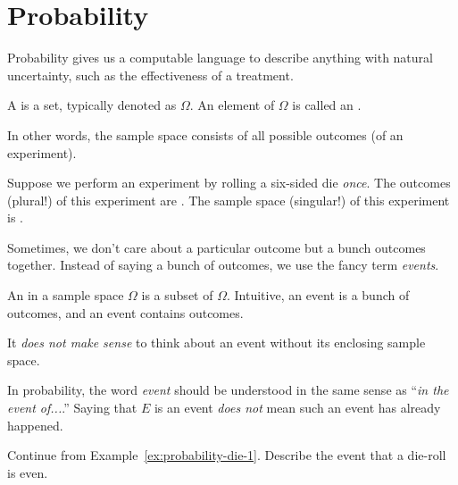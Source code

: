 \documentclass[../main.tex]{subfiles}
\begin{document}
 \section{Probability}


Probability gives us a computable language to describe anything with natural uncertainty, such as the effectiveness of a treatment.

\begin{definition}
  A  is a set, typically denoted as \(\Omega\).  An element of \(\Omega\) is called an .  

  In other words, the sample space consists of all possible outcomes (of an experiment).
\end{definition}

\begin{example} \label{ex:probability-die-1}
  Suppose we perform an experiment by rolling a six-sided die \emph{once}.  The outcomes (plural!) of this experiment are \underline{\hspace{2in}}.  The sample space (singular!) of this experiment is \underline{\hspace{2in}}.
\end{example}

Sometimes, we don't care about a particular outcome but a bunch outcomes together. Instead of saying a bunch of outcomes, we use the fancy term \emph{events}.

\begin{definition}[events]
  An  in a sample space \(\Omega\) is a subset of \(\Omega\).  Intuitive, an event is a bunch of outcomes, and an event contains outcomes.

  \faExclamationTriangle{} It \emph{does not make sense} to think about an event without its enclosing sample space.
\end{definition}
In probability, the word \emph{event} should be understood in the same sense as ``\emph{in the event of...}.'' Saying that \(E\) is an event \emph{does not} mean such an event has already happened.

\begin{example} \label{ex:probability-die-2}
  Continue from Example~\ref{ex:probability-die-1}.  Describe the event that a die-roll is even.
\end{example}
\end{document}
